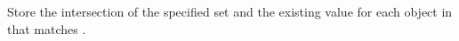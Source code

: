 Store the intersection of the specified set and the existing value for each
object in  that matches .


